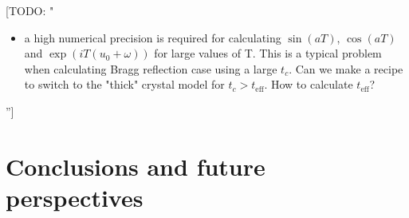 \documentclass[preprint]{iucr}              %
\newcommand{\todo}[1]{{\color{red}[TODO: "#1'']}}
\begin{document}
\todo{
\begin{itemize}
    \item a high numerical precision is required for calculating $\sin(aT)$, $\cos(aT)$ and $\exp(iT(u_0+\omega))$ for large values of T. This is  a typical problem when calculating Bragg reflection case using a large $t_c$. Can we make a recipe to switch to the "thick" crystal model for $t_c>t_{\text{eff}}$. How to calculate $t_{\text{eff}}$? 
\end{itemize}
}






\section{Conclusions and future perspectives}
\label{sec:summary}
\end{document}
